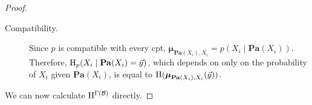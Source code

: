 \documentclass{article}
\newcommand{\bmu}{\boldsymbol{\mu}}
\def\Pa{\mathbf{Pa}}
\def\extrainfo{extra information}
\begin{document}
\begin{proof}
\begin{description}
	\item[Compatibility.] Since $p$ is compatible with every cpt, $\bmu_{\Pa(X_i),X_i} = p(X_i \mid \Pa(X_i))$. Therefore, $\H_p(X_i \mid \Pa(X_i) = \vec y) $, which depends on only on the probability of $X_i$ given $\Pa(X_i)$, is equal to $\H(\bmu_{\Pa(X_i),X_i}(\vec y))$. 
	\end{description}
	We can now calculate $\mathrm{H}^{\Gamma(\cal B)}$ directly.
		
		

\end{proof}
\end{document}
